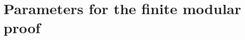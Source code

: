 \documentclass[11pt]{article}
\begin{document}
\clearpage
\appendix
\section{Parameters for the finite modular proof}
\begin{table}[ht]
\centering

\caption{Parameters in Lemma~\ref{lem:reduction}, with $d=q-1$.
Column $j$ uses $(s_j,t_j)$ specified in the text. A dash denotes a prime
above the target for that column. The zero sets are in Table~\ref{tab:zeros}.}
\label{tab:parameters}
\end{table}
\end{document}
